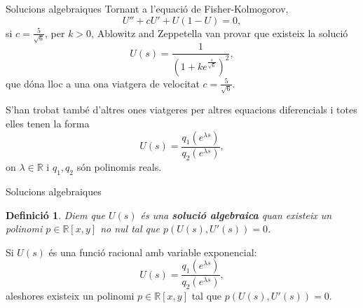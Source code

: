 \documentclass{beamer}
\newtheorem{definicio}{Definici\'{o}}
\theoremstyle{definition}
\begin{document}
\begin{frame}{Solucions algebraiques}
Tornant a l'equaci\'{o} de Fisher-Kolmogorov,
\[U''+cU'+U(1-U)=0,\]
si $c=\frac{5}{\sqrt{6}}$, per $k>0$, Ablowitz and Zeppetella van provar que existeix la soluci\'{o}
\[U(s)=\frac{1}{\left(1+ke^{\frac{s}{\sqrt{6}}}\right)^2},\]
que d\'{o}na lloc a una ona viatgera de velocitat $c=\frac{5}{\sqrt{6}}$.
\pause

S'han trobat tamb\'{e} d'altres ones viatgeres per altres equacions diferencials i totes elles tenen la forma
\[U(s)=\frac{q_1(e^{\lambda s})}{q_2(e^{\lambda s})},\]
on $\lambda\in\mathbb{R}$ i $q_1,q_2$ s\'{o}n polinomis reals.
\end{frame}

\begin{frame}{Solucions algebraiques}
\begin{definicio}
Diem que $U(s)$ \'{e}s una \textbf{soluci\'{o} algebraica} quan existeix un polinomi $p\in\mathbb{R}[x,y]$ no nul tal que $p(U(s),U'(s))=0$.
\end{definicio}
\pause
\begin{lemma}
Si $U(s)$ \'{e}s una funci\'{o} racional amb variable exponencial:
\[U(s)=\frac{q_1(e^{\lambda s})}{q_2(e^{\lambda s})},\]
aleshores existeix un polinomi $p\in\mathbb{R}[x,y]$ tal que $p(U(s),U'(s))=0$.
\end{lemma}
\end{frame}
\end{document}
